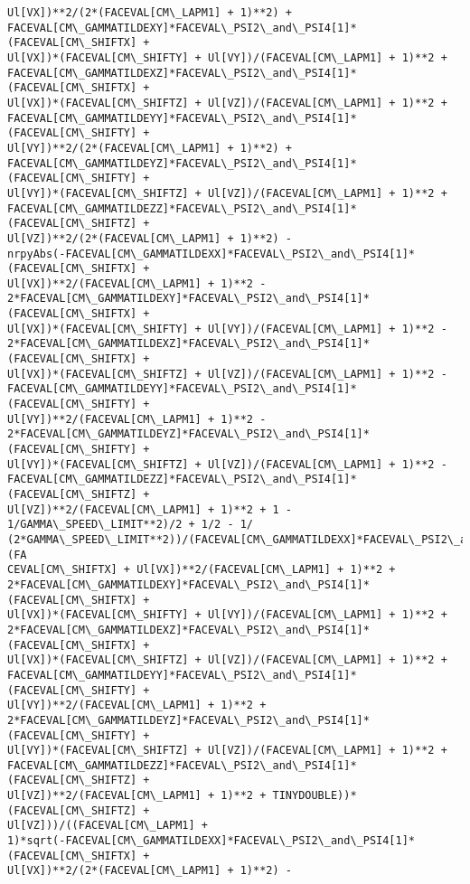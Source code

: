 \documentclass[landscape,letterpaper,10pt,english]{article}
\begin{document}
\begin{Verbatim}[commandchars=\\\{\}]
Ul[VX])**2/(2*(FACEVAL[CM\_LAPM1] + 1)**2) +
FACEVAL[CM\_GAMMATILDEXY]*FACEVAL\_PSI2\_and\_PSI4[1]*(FACEVAL[CM\_SHIFTX] +
Ul[VX])*(FACEVAL[CM\_SHIFTY] + Ul[VY])/(FACEVAL[CM\_LAPM1] + 1)**2 +
FACEVAL[CM\_GAMMATILDEXZ]*FACEVAL\_PSI2\_and\_PSI4[1]*(FACEVAL[CM\_SHIFTX] +
Ul[VX])*(FACEVAL[CM\_SHIFTZ] + Ul[VZ])/(FACEVAL[CM\_LAPM1] + 1)**2 +
FACEVAL[CM\_GAMMATILDEYY]*FACEVAL\_PSI2\_and\_PSI4[1]*(FACEVAL[CM\_SHIFTY] +
Ul[VY])**2/(2*(FACEVAL[CM\_LAPM1] + 1)**2) +
FACEVAL[CM\_GAMMATILDEYZ]*FACEVAL\_PSI2\_and\_PSI4[1]*(FACEVAL[CM\_SHIFTY] +
Ul[VY])*(FACEVAL[CM\_SHIFTZ] + Ul[VZ])/(FACEVAL[CM\_LAPM1] + 1)**2 +
FACEVAL[CM\_GAMMATILDEZZ]*FACEVAL\_PSI2\_and\_PSI4[1]*(FACEVAL[CM\_SHIFTZ] +
Ul[VZ])**2/(2*(FACEVAL[CM\_LAPM1] + 1)**2) -
nrpyAbs(-FACEVAL[CM\_GAMMATILDEXX]*FACEVAL\_PSI2\_and\_PSI4[1]*(FACEVAL[CM\_SHIFTX] +
Ul[VX])**2/(FACEVAL[CM\_LAPM1] + 1)**2 -
2*FACEVAL[CM\_GAMMATILDEXY]*FACEVAL\_PSI2\_and\_PSI4[1]*(FACEVAL[CM\_SHIFTX] +
Ul[VX])*(FACEVAL[CM\_SHIFTY] + Ul[VY])/(FACEVAL[CM\_LAPM1] + 1)**2 -
2*FACEVAL[CM\_GAMMATILDEXZ]*FACEVAL\_PSI2\_and\_PSI4[1]*(FACEVAL[CM\_SHIFTX] +
Ul[VX])*(FACEVAL[CM\_SHIFTZ] + Ul[VZ])/(FACEVAL[CM\_LAPM1] + 1)**2 -
FACEVAL[CM\_GAMMATILDEYY]*FACEVAL\_PSI2\_and\_PSI4[1]*(FACEVAL[CM\_SHIFTY] +
Ul[VY])**2/(FACEVAL[CM\_LAPM1] + 1)**2 -
2*FACEVAL[CM\_GAMMATILDEYZ]*FACEVAL\_PSI2\_and\_PSI4[1]*(FACEVAL[CM\_SHIFTY] +
Ul[VY])*(FACEVAL[CM\_SHIFTZ] + Ul[VZ])/(FACEVAL[CM\_LAPM1] + 1)**2 -
FACEVAL[CM\_GAMMATILDEZZ]*FACEVAL\_PSI2\_and\_PSI4[1]*(FACEVAL[CM\_SHIFTZ] +
Ul[VZ])**2/(FACEVAL[CM\_LAPM1] + 1)**2 + 1 - 1/GAMMA\_SPEED\_LIMIT**2)/2 + 1/2 - 1/
(2*GAMMA\_SPEED\_LIMIT**2))/(FACEVAL[CM\_GAMMATILDEXX]*FACEVAL\_PSI2\_and\_PSI4[1]*(FA
CEVAL[CM\_SHIFTX] + Ul[VX])**2/(FACEVAL[CM\_LAPM1] + 1)**2 +
2*FACEVAL[CM\_GAMMATILDEXY]*FACEVAL\_PSI2\_and\_PSI4[1]*(FACEVAL[CM\_SHIFTX] +
Ul[VX])*(FACEVAL[CM\_SHIFTY] + Ul[VY])/(FACEVAL[CM\_LAPM1] + 1)**2 +
2*FACEVAL[CM\_GAMMATILDEXZ]*FACEVAL\_PSI2\_and\_PSI4[1]*(FACEVAL[CM\_SHIFTX] +
Ul[VX])*(FACEVAL[CM\_SHIFTZ] + Ul[VZ])/(FACEVAL[CM\_LAPM1] + 1)**2 +
FACEVAL[CM\_GAMMATILDEYY]*FACEVAL\_PSI2\_and\_PSI4[1]*(FACEVAL[CM\_SHIFTY] +
Ul[VY])**2/(FACEVAL[CM\_LAPM1] + 1)**2 +
2*FACEVAL[CM\_GAMMATILDEYZ]*FACEVAL\_PSI2\_and\_PSI4[1]*(FACEVAL[CM\_SHIFTY] +
Ul[VY])*(FACEVAL[CM\_SHIFTZ] + Ul[VZ])/(FACEVAL[CM\_LAPM1] + 1)**2 +
FACEVAL[CM\_GAMMATILDEZZ]*FACEVAL\_PSI2\_and\_PSI4[1]*(FACEVAL[CM\_SHIFTZ] +
Ul[VZ])**2/(FACEVAL[CM\_LAPM1] + 1)**2 + TINYDOUBLE))*(FACEVAL[CM\_SHIFTZ] +
Ul[VZ]))/((FACEVAL[CM\_LAPM1] +
1)*sqrt(-FACEVAL[CM\_GAMMATILDEXX]*FACEVAL\_PSI2\_and\_PSI4[1]*(FACEVAL[CM\_SHIFTX] +
Ul[VX])**2/(2*(FACEVAL[CM\_LAPM1] + 1)**2) -

\end{Verbatim}
\end{document}
